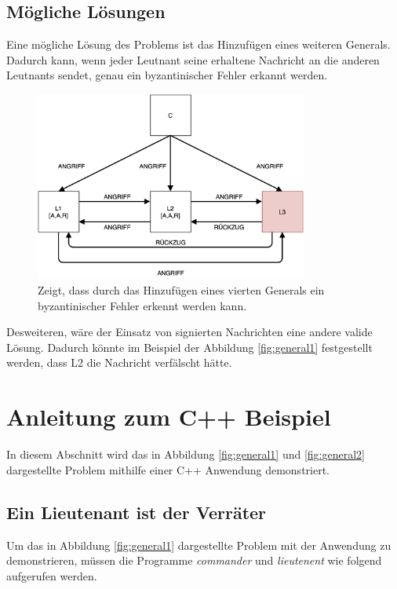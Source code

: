 \documentclass{article}
\begin{document}
\subsection{Mögliche Lösungen}
Eine mögliche Lösung des Problems ist das Hinzufügen eines weiteren Generals. 
Dadurch kann, wenn jeder Leutnant seine erhaltene Nachricht an die anderen Leutnants 
sendet, genau ein byzantinischer Fehler erkannt werden. 

\begin{figure}[H]
    \centering
    \includegraphics[width=0.8\textwidth]{omalgo.png}
    \caption{Zeigt, dass durch das Hinzufügen eines vierten Generals ein byzantinischer Fehler erkennt werden kann.}
    \label{fig:omalgo}
\end{figure}

\medskip 

Desweiteren, wäre der Einsatz von signierten Nachrichten eine andere valide Lösung. 
Dadurch könnte im Beispiel der Abbildung \ref{fig:general1} festgestellt werden,
dass L2 die Nachricht verfälscht hätte. 

\newpage 

\section{Anleitung zum C++ Beispiel}

In diesem Abschnitt wird das in Abbildung \ref{fig:general1} und \ref{fig:general2} 
dargestellte Problem mithilfe einer C++ Anwendung demonstriert. 

\subsection{Ein Lieutenant ist der Verräter}

Um das in Abbildung \ref{fig:general1} dargestellte Problem 
mit der Anwendung zu demonstrieren, müssen die Programme 
\textit{commander} und \textit{lieutenent} wie folgend aufgerufen werden.
\end{document}
